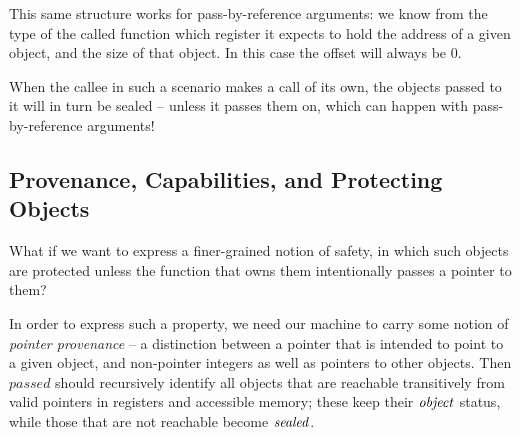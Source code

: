 \documentclass[10pt,conference]{ieeetran}%
\theoremstyle{definition}
\begin{document}
This same structure works for pass-by-reference arguments: we know from the type of
the called function which register it expects to hold the address of a given object,
and the size of that object. In this case the offset will always be 0.

When the callee in such a scenario makes a call of its own, the objects passed to it
will in turn be sealed -- unless it passes them on, which can happen with pass-by-reference
arguments!

\subsection{Provenance, Capabilities, and Protecting Objects}

What if we want to express a finer-grained notion of safety, in which
such objects are protected unless the function that owns them intentionally
passes a pointer to them?

In order to express such a property, we need our machine to carry some notion
of {\it pointer provenance} -- a distinction between a pointer that is intended to
point to a given object, and non-pointer integers as well as pointers to other objects.
Then \(\mathit{passed}\) should recursively identify all objects that
are reachable transitively from valid pointers in registers and accessible memory;
these keep their \(\mathit{object}\) status, while those that are not reachable become \(\mathit{sealed}\).
         


\end{document}
